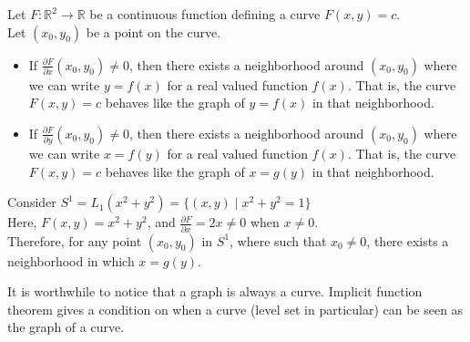 \vspace{0.4cm}
\begin{theorem}
    Let $F:\mathbb{R}^2\to\mathbb{R}$ be a continuous function defining a curve $F(x,y)=c$.\\ 
    Let $(x_0,y_0)$ be a point on the curve.
    \begin{itemize}
        \item If $\frac{\partial F}{\partial x}(x_0,y_0)\neq 0$, then there exists a neighborhood around $(x_0,y_0)$ where we can write $y=f(x)$ for a real valued function $f(x)$. That is, the curve $F(x,y)=c$ behaves like the graph of $y=f(x)$ in that neighborhood.
        \item If $\frac{\partial F}{\partial y}(x_0,y_0)\neq 0$, then there exists a neighborhood around $(x_0,y_0)$ where we can write $x=f(y)$ for a real valued function $f(x)$. That is, the curve $F(x,y)=c$ behaves like the graph of $x=g(y)$ in that neighborhood.
    \end{itemize}
\end{theorem}
\vspace{0.4cm}
\begin{eg}
    Consider $S^1=L_1(x^2+y^2)=\{(x,y)\mid x^2+y^2=1\}$\\ 
    Here, $F(x,y)=x^2+y^2$, and $\frac{\partial F}{\partial x}=2x\neq 0$ when $x\neq0$.\\ 
    Therefore, for any point $(x_0,y_0)$ in $S^1$, where such that $x_0\neq0$, there exists a neighborhood in which $x=g(y)$.
\end{eg}
\vspace{0.4cm}
\begin{note}
    It is worthwhile to notice that a graph is always a curve. Implicit function theorem gives a condition on when a curve (level set in particular) can be seen as the graph of a curve.
\end{note}
\vspace{0.4cm}

